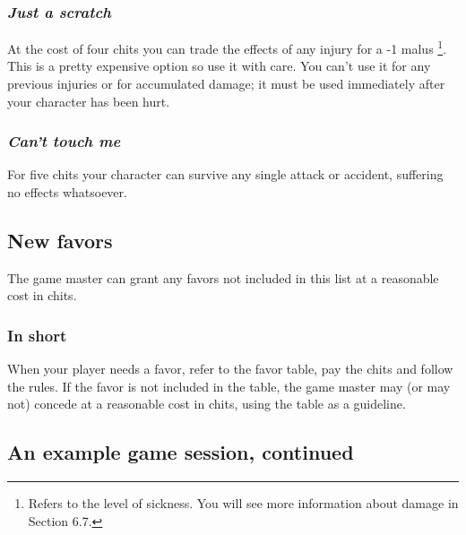 \subsubsection*{\emph{Just a scratch}}

At the cost of four chits you can trade the effects of any injury
for a -1 malus%
\footnote{Refers to the level of sickness. You will see more information about
damage in Section 6.7.%
}. This is a pretty expensive option so use it with care. You can't
use it for any previous injuries or for accumulated damage; it must
be used immediately after your character has been hurt.


\subsubsection*{\emph{Can't touch me}}

For five chits your character can survive any single attack or accident,
suffering no effects whatsoever.


\subsection*{New favors}

The game master can grant any favors not included in this list at
a reasonable cost in chits. 


\subsubsection*{In short}

When your player needs a favor, refer to the favor table, pay the
chits and follow the rules. If the favor is not included in the table,
the game master may (or may not) concede at a reasonable cost in chits,
using the table as a guideline.


\subsection*{An example game session, continued}

